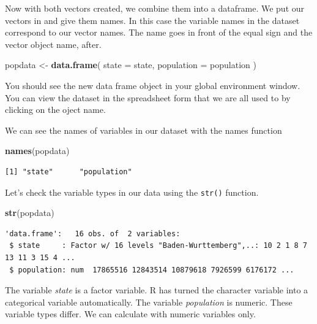 \documentclass[]{book}
\newenvironment{Shaded}{\begin{snugshade}}{\end{snugshade}}
\newcommand{\KeywordTok}[1]{\textcolor[rgb]{0.13,0.29,0.53}{\textbf{#1}}}
\newcommand{\DataTypeTok}[1]{\textcolor[rgb]{0.13,0.29,0.53}{#1}}
\newcommand{\StringTok}[1]{\textcolor[rgb]{0.31,0.60,0.02}{#1}}
\newcommand{\NormalTok}[1]{#1}
\theoremstyle{definition}
\theoremstyle{definition}
\theoremstyle{definition}
\theoremstyle{remark}
\begin{document}
Now with both vectors created, we combine them into a dataframe. We put
our vectors in and give them names. In this case the variable names in
the dataset correspond to our vector names. The name goes in front of
the equal sign and the vector object name, after.

\begin{Shaded}
\begin{Highlighting}[]
\NormalTok{popdata <-}\StringTok{ }\KeywordTok{data.frame}\NormalTok{( }
  \DataTypeTok{state =}\NormalTok{ state,}
  \DataTypeTok{population =}\NormalTok{ population}
\NormalTok{  )}
\end{Highlighting}
\end{Shaded}

You should see the new data frame object in your global environment
window. You can view the dataset in the spreadsheet form that we are all
used to by clicking on the oject name.

We can see the names of variables in our dataset with the names function

\begin{Shaded}
\begin{Highlighting}[]
\KeywordTok{names}\NormalTok{(popdata)}
\end{Highlighting}
\end{Shaded}

\begin{verbatim}
[1] "state"      "population"
\end{verbatim}

Let's check the variable types in our data using the \texttt{str()}
function.

\begin{Shaded}
\begin{Highlighting}[]
\KeywordTok{str}\NormalTok{(popdata)}
\end{Highlighting}
\end{Shaded}

\begin{verbatim}
'data.frame':   16 obs. of  2 variables:
 $ state     : Factor w/ 16 levels "Baden-Wurttemberg",..: 10 2 1 8 7 13 11 3 15 4 ...
 $ population: num  17865516 12843514 10879618 7926599 6176172 ...
\end{verbatim}

The variable \emph{state} is a factor variable. R has turned the
character variable into a categorical variable automatically. The
variable \emph{population} is numeric. These variable types differ. We
can calculate with numeric variables only.
\end{document}
